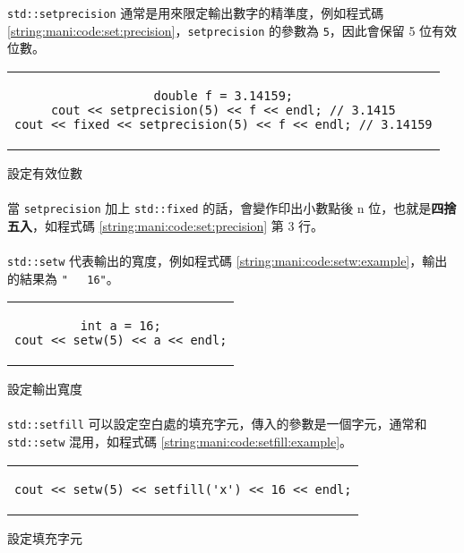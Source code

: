 \documentclass[12pt,a4paper,oneside]{article}
\begin{document}
\begin{CJK}{UTF8}{bkai}
\lstinline!std::setprecision! 通常是用來限定輸出數字的精準度，例如程式碼 \ref{string:mani:code:set:precision}，\lstinline!setprecision! 的參數為 \lstinline!5!，因此會保留 5 位有效位數。

\begin{code}[h!]
  \centering
  \begin{tabular}{c}
  \begin{lstlisting}
double f = 3.14159;
cout << setprecision(5) << f << endl; // 3.1415
cout << fixed << setprecision(5) << f << endl; // 3.14159
  \end{lstlisting}
  \end{tabular}
  \caption{設定有效位數}
  \label{string:mani:code:set:precision}
\end{code}

\paragraph{}當 \lstinline!setprecision! 加上 \lstinline!std::fixed! 的話，會變作印出小數點後 n 位，也就是\textbf{四捨五入}，如程式碼 \ref{string:mani:code:set:precision} 第 3 行。
\paragraph{}\lstinline!std::setw! 代表輸出的寬度，例如程式碼 \ref{string:mani:code:setw:example}，輸出的結果為 \lstinline!"   16"!。

\begin{code}[h!]
  \centering
  \begin{tabular}{c}
  \begin{lstlisting}
int a = 16;
cout << setw(5) << a << endl;
  \end{lstlisting}
  \end{tabular}
  \caption{設定輸出寬度}
  \label{string:mani:code:setw:example}
\end{code}

\paragraph{}\lstinline!std::setfill! 可以設定空白處的填充字元，傳入的參數是一個字元，通常和 \lstinline!std::setw! 混用，如程式碼 \ref{string:mani:code:setfill:example}。

\begin{code}[h!]
  \centering
  \begin{tabular}{c}
  \begin{lstlisting}
cout << setw(5) << setfill('x') << 16 << endl;
  \end{lstlisting}
  \end{tabular}
  \caption{設定填充字元}
  \label{string:mani:code:setfill:example}
\end{code}


\end{CJK}
\end{document}
